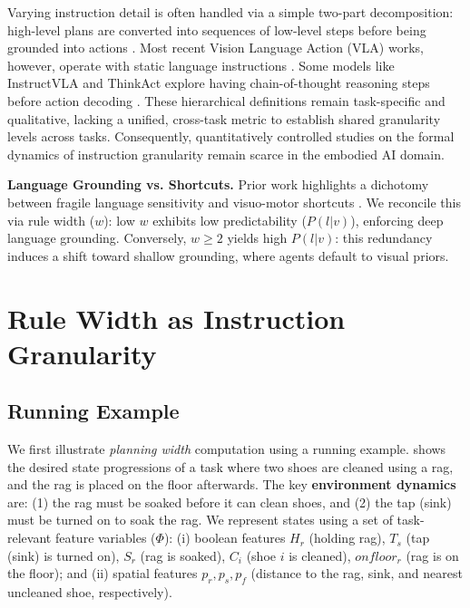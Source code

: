 \documentclass[11pt]{article}
\begin{document}
Varying instruction detail is often handled via a simple two-part decomposition: high-level plans are converted into sequences of low-level steps before being grounded into actions \citep{arumugam2017accurately, DBLP:conf/wuwnet/Yang0H24,DBLP:conf/icml/ShiIEKPVTWWFLDG25}. Most recent Vision Language Action (VLA) works, however, operate with static language instructions \citep{ma2025surveyvisionlanguageactionmodelsembodied,li2025cogvla}. Some models like InstructVLA and ThinkAct explore having chain-of-thought reasoning steps before action decoding \citep{yang2025instructvlavisionlanguageactioninstructiontuning,huang2025thinkactvisionlanguageactionreasoningreinforced}. These hierarchical definitions remain task-specific and qualitative, lacking a unified, cross-task metric to establish shared granularity levels across tasks. Consequently, quantitatively controlled studies on the formal dynamics of instruction granularity remain scarce in the embodied AI domain.

\noindent\textbf{Language Grounding vs. Shortcuts.} 
Prior work highlights a dichotomy between fragile language sensitivity \citep{akula-etal-2022-alfred} and visuo-motor shortcuts \citep{xing2025shortcut, zhang2026restoringlinguisticgroundingvla}. We reconcile this via rule width ($w$): low $w$ exhibits low predictability ($P(l| v)$), enforcing deep language grounding. Conversely, $w \ge 2$ yields high $P(l | v)$: this redundancy induces a shift toward shallow grounding, where agents default to visual priors.


\section{Rule Width as Instruction Granularity}
\label{sec:granularity_as_width}

\subsection{Running Example}
\label{subsec:running_example_init}
We first illustrate \emph{planning width} computation using a running example.  shows the desired state progressions of a task where two shoes are cleaned using a rag, and the rag is placed on the floor afterwards. The key \textbf{environment dynamics} are: (1) the rag must be soaked before it can clean shoes, and (2) the tap (sink) must be turned on to soak the rag. We represent states using a set of task-relevant feature variables ($\Phi$): (i) boolean features $H_r$ (holding rag), $T_s$ (tap (sink) is turned on), $S_r$ (rag is soaked), $C_i$ (shoe $i$ is cleaned), $onfloor_r$ (rag is on the floor); and (ii) spatial features $p_r, p_s, p_f$ (distance to the rag, sink, and nearest uncleaned shoe, respectively).
\end{document}

